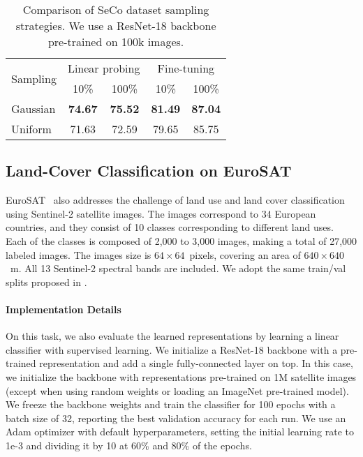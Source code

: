 \documentclass[10pt,twocolumn,letterpaper]{article}
\newcommand{\methodname}[0]{SeCo}
\begin{document}
\begin{table}[t]
    \begin{center}
    \begin{tabular}{l|cccc}
        \toprule
        \multirow{2}{*}{Sampling} & \multicolumn{2}{c}{Linear probing} & \multicolumn{2}{c}{Fine-tuning} \\
        & 10\% & 100\% & 10\% & 100\% \\
        \hline\hline
        Gaussian & \textbf{74.67} & \textbf{75.52} & \textbf{81.49} & \textbf{87.04} \\
        Uniform & 71.63 & 72.59 & 79.65 & 85.75 \\
        \bottomrule
    \end{tabular}
    \end{center}
    \caption{Comparison of \methodname{} dataset sampling strategies. We use a ResNet-18 backbone pre-trained on 100k images.}
    \label{tab:ablation_sampling}
\end{table}

\subsection{Land-Cover Classification on EuroSAT}
EuroSAT~\citep{helber2019eurosat} also addresses the challenge of land use and land cover classification using Sentinel-2 satellite images. The images correspond to 34 European countries, and they consist of 10 classes corresponding to different land uses. Each of the classes is composed of 2,000 to 3,000 images, making a total of 27,000 labeled images. The images size is $64 \times 64$~pixels, covering an area of $640 \times 640$~m. All 13 Sentinel-2 spectral bands are included. We adopt the same train/val splits proposed in \cite{neumann2019domain}.

\vspace{-1em}\paragraph{Implementation Details}
On this task, we also evaluate the learned representations by learning a linear classifier with supervised learning. We initialize a ResNet-18 backbone with a pre-trained representation and add a single fully-connected layer on top. In this case, we initialize the backbone with representations pre-trained on 1M satellite images (except when using random weights or loading an ImageNet pre-trained model). We freeze the backbone weights and train the classifier for 100 epochs with a batch size of 32, reporting the best validation accuracy for each run. We use an Adam optimizer with default hyperparameters, setting the initial learning rate to 1e-3 and dividing it by 10 at 60\% and 80\% of the epochs.
\end{document}
